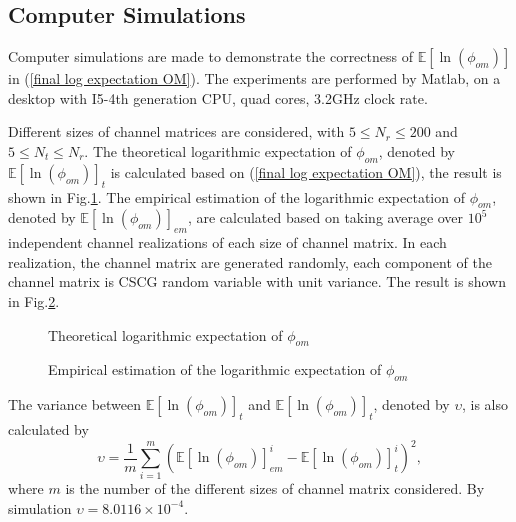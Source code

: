 \documentclass[12pt, draftclsnofoot, onecolumn]{IEEEtran}
\begin{document}
\subsection{Computer Simulations}
Computer simulations are made to demonstrate the correctness of $\mathbb{E}[\ln(\phi_{om})]$ in (\ref{final log expectation OM}). The experiments are performed by Matlab, on a desktop with I5-4th generation CPU, quad cores, 3.2GHz clock rate.

Different sizes of channel matrices are considered, with $5\leq N_{r}\leq 200$ and $5\leq N_{t}\leq N_{r}$. The theoretical logarithmic expectation of $\phi_{om}$, denoted by $\mathbb{E}[\ln(\phi_{om})]_{t}$ is calculated based on (\ref{final log expectation OM}), the result is shown in Fig.\ref{flogOMt}. The empirical estimation of the logarithmic expectation of $\phi_{om}$, denoted by $\mathbb{E}[\ln(\phi_{om})]_{em}$, are calculated based on taking average over $10^{5}$ independent channel realizations of each size of channel matrix. In each realization, the channel matrix are generated randomly, each component of the channel matrix is CSCG random variable with unit variance. The result is shown in Fig.\ref{flogOMem}. 
\begin{figure}[htb]
\centering
\def\svgwidth{\columnwidth}

\caption{Theoretical logarithmic expectation of $\phi_{om}$}
\label{flogOMt}
\end{figure}

\begin{figure}[htb]
\centering
\def\svgwidth{\columnwidth}

\caption{Empirical estimation of the logarithmic expectation of $\phi_{om}$}
\label{flogOMem}
\end{figure}

The variance between $\mathbb{E}[\ln(\phi_{om})]_{t}$ and $\mathbb{E}[\ln(\phi_{om})]_{t}$, denoted by $\upsilon$, is also calculated by \begin{equation}
\upsilon=\frac{1}{m}\sum_{i=1}^{m}(\mathbb{E}[\ln(\phi_{om})]^{i}_{em}-\mathbb{E}[\ln(\phi_{om})]^{i}_{t})^{2},
\label{variance OM}
\end{equation} 
where $m$ is the number of the different sizes of channel matrix considered. By simulation $\upsilon=8.0116\times 10^{-4}$.
\end{document}
